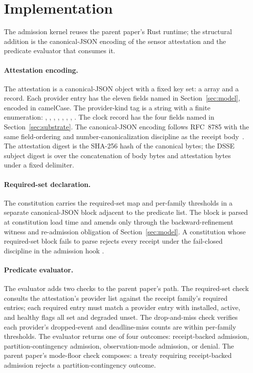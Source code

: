 \section{Implementation}
\label{sec:implementation}

The admission kernel reuses the parent paper's Rust runtime; the structural addition is the canonical-JSON encoding of the sensor attestation and the predicate evaluator that consumes it.

\paragraph{Attestation encoding.}
The attestation is a canonical-JSON object with a fixed key set: a  array and a  record. Each provider entry has the eleven fields named in Section~\ref{sec:model}, encoded in camelCase. The provider-kind tag is a string with a finite enumeration: , , , , , , , . The clock record has the four fields named in Section~\ref{sec:substrate}. The canonical-JSON encoding follows RFC~8785 with the same field-ordering and number-canonicalization discipline as the receipt body~\cite{rfc8785}. The attestation digest is the SHA-256 hash of the canonical bytes; the DSSE subject digest is over the concatenation of body bytes and attestation bytes under a fixed delimiter.

\paragraph{Required-set declaration.}
The constitution carries the required-set map and per-family thresholds in a separate canonical-JSON block adjacent to the predicate list. The block is parsed at constitution load time and amends only through the backward-refinement witness and re-admission obligation of Section~\ref{sec:model}. A constitution whose required-set block fails to parse rejects every receipt under the fail-closed discipline in the admission hook .

\paragraph{Predicate evaluator.}
The evaluator adds two checks to the parent paper's path. The required-set check consults the attestation's provider list against the receipt family's required entries; each required entry must match a provider entry with installed, active, and healthy flags all set and degraded unset. The drop-and-miss check verifies each provider's dropped-event and deadline-miss counts are within per-family thresholds. The evaluator returns one of four outcomes: receipt-backed admission, partition-contingency admission, observation-mode admission, or denial. The parent paper's mode-floor check composes: a treaty requiring receipt-backed admission rejects a partition-contingency outcome.

